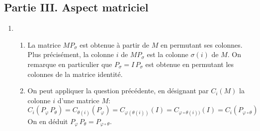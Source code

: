 \subsection*{Partie III. Aspect matriciel}
\begin{enumerate}
  \item 
\begin{enumerate}
  \item La matrice $MP_{\sigma}$ est obtenue à partir de $M$ en permutant ses colonnes. Plus précisément, la colonne $i$ de $MP_{\sigma}$ est la colonne $\sigma(i)$ de $M$.\newline
  On remarque en particulier que $P_\sigma = I\,P_\sigma$ est obtenue en permutant les colonnes de la matrice identité.
  \item On peut appliquer la question précédente, en désignant par $C_i(M)$ la colonne $i$ d'une matrice $M$:
\begin{displaymath}
C_i(P_{\varphi}\,P_{\theta}) = C_{\theta(i)}(P_{\varphi})
= C_{\varphi(\theta(i))}(I) = C_{\varphi \circ \theta(i))}(I) = C_i(P_{\varphi \circ \theta})
\end{displaymath}
On en déduit $P_{\varphi}\,P_{\theta} = P_{\varphi \circ \theta}$.
\end{enumerate}


\end{enumerate}
